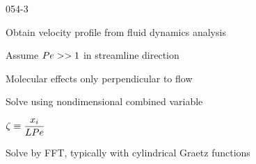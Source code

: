 \begin{mitframe}{054-3}
\begin{listone}
	\item  Obtain velocity profile from fluid dynamics analysis
    \item Assume $\peclet>>1$ in streamline direction
		\begin{listtwo}
        		\item Molecular effects only perpendicular to flow
        \end{listtwo}
		\item Solve using nondimensional combined variable
        	\begin{listtwo}
            		\item $\zeta\equiv\dfrac{\specfrac{i}}{\length\peclet}$
            \end{listtwo}
	\item Solve by FFT, typically with cylindrical Graetz functions
\end{listone}        
\end{mitframe}
